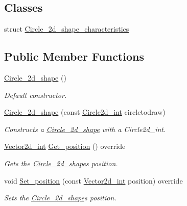 \subsection*{Classes}
\begin{DoxyCompactItemize}
\item 
struct \hyperlink{structjetfuel_1_1draw_1_1Circle__2d__shape_1_1Circle__2d__shape__characteristics}{Circle\+\_\+2d\+\_\+shape\+\_\+characteristics}
\end{DoxyCompactItemize}
\subsection*{Public Member Functions}
\begin{DoxyCompactItemize}
\item 
\hyperlink{classjetfuel_1_1draw_1_1Circle__2d__shape_a0c6320cecb7ee7bfff185f4607a5f830}{Circle\+\_\+2d\+\_\+shape} ()
\begin{DoxyCompactList}\small\item\em Default constructor. \end{DoxyCompactList}\item 
\hyperlink{classjetfuel_1_1draw_1_1Circle__2d__shape_ad2be0a546c65e671a92dd30e20461afe}{Circle\+\_\+2d\+\_\+shape} (const \hyperlink{classjetfuel_1_1draw_1_1Circle2d}{Circle2d\+\_\+int} circletodraw)
\begin{DoxyCompactList}\small\item\em Constructs a \hyperlink{classjetfuel_1_1draw_1_1Circle__2d__shape}{Circle\+\_\+2d\+\_\+shape} with a Circle2d\+\_\+int. \end{DoxyCompactList}\item 
\hyperlink{classjetfuel_1_1draw_1_1Vector2d}{Vector2d\+\_\+int} \hyperlink{classjetfuel_1_1draw_1_1Circle__2d__shape_a99b93544660c7f5b11cf8f0169e8fec1}{Get\+\_\+position} () override
\begin{DoxyCompactList}\small\item\em Gets the \hyperlink{classjetfuel_1_1draw_1_1Circle__2d__shape}{Circle\+\_\+2d\+\_\+shape}\textquotesingle{}s position. \end{DoxyCompactList}\item 
void \hyperlink{classjetfuel_1_1draw_1_1Circle__2d__shape_a551b38063543823483f560bf3eebcd2c}{Set\+\_\+position} (const \hyperlink{classjetfuel_1_1draw_1_1Vector2d}{Vector2d\+\_\+int} position) override
\begin{DoxyCompactList}\small\item\em Sets the \hyperlink{classjetfuel_1_1draw_1_1Circle__2d__shape}{Circle\+\_\+2d\+\_\+shape}\textquotesingle{}s position. \end{DoxyCompactList}\item 

\end{DoxyCompactItemize}
